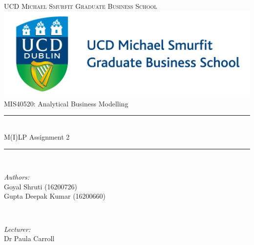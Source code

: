 \documentclass[paper=a4, fontsize=11pt]{scrartcl} %
\begin{document}
\begin{titlepage}
\newcommand{\HRule}{\rule{\linewidth}{0.5mm}} %
\center %

\textsc{\LARGE UCD Michael Smurfit Graduate Business School}\\[1.7cm] %
\includegraphics[scale = 0.7]{logo.png} \\ [1cm]
\textrm{\Large	\textrm{MIS40520: Analytical Business Modelling}}\\[0.6cm] %


\HRule \\[0.5cm]
{ \LARGE  \textrm{M(I)LP Assignment 2}}\\[0.5cm] %
\HRule \\[1.5cm]
 

\begin{minipage}{0.45\textwidth}
\begin{flushleft} \large
\emph{\textrm{Authors:}}\\
\normalsize{Goyal \textrm{Shruti} (16200726)}\\
\normalsize{Gupta \textrm{Deepak Kumar} (16200660) }\\
\end{flushleft}
\end{minipage}
~
~
\begin{minipage}{0.45\textwidth}
\begin{flushright} \large
\emph{\textrm{Lecturer:}} \\
\normalsize{Dr Paula \textrm{Carroll}} %
\end{flushright}
\end{minipage}\\[3cm]


\end{titlepage}
\end{document}
